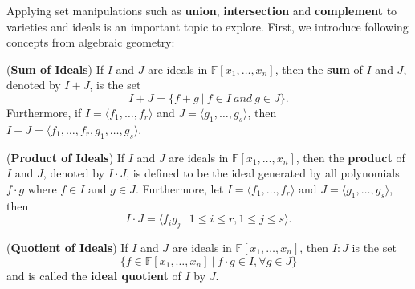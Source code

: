\begin{figure}[hbt]
\end{figure}
Applying set manipulations such as {\bf union}, {\bf intersection} and {\bf complement} to varieties 
and ideals is an important topic to explore. First, we introduce following concepts from algebraic geometry:
\begin{Definition}
\label{def:sum}
({\bf Sum of Ideals}) If $I$ and $J$ are ideals in $\mathbb F[x_1, \dots, x_n]$, then the 
{\bf sum} of $I$ and $J$, denoted by $I + J$, is the set
  \begin{equation}
  I + J = \{f + g\ |\ f \in I \ and\  g \in J\}.
  \end{equation}
Furthermore, if $I = \langle f_1, \dots, f_r\rangle$ and 
$J = \langle g_1, \dots, g_s\rangle$, then 
$I + J = \langle f_1, \dots, f_r, g_1, \dots, g_s\rangle$.
\end{Definition}
\begin{Definition}
\label{def:prod}
({\bf Product of Ideals}) If $I$ and $J$ are ideals in $\mathbb F[x_1, \dots, x_n]$, then the
{\bf product} of $I$ and $J$, denoted by $I \cdot J$, is defined to be the ideal generated 
by all polynomials $f \cdot g$ where $f \in I$ and $g \in J$. Furthermore, let
$I = \langle f_1, \dots, f_r\rangle$ and $J = \langle g_1, \dots, g_s\rangle$, then
  \begin{equation}
  I \cdot J = \langle f_ig_j\ |\ 1 \leq i \leq r, 1 \leq j \leq s\rangle .
  \end{equation}
\end{Definition}
\begin{Definition}
({\bf Quotient of Ideals}) If $I$ and $J$ are ideals in $\mathbb F[x_1, \dots, x_n]$, then $I:J$
is the set
  \begin{equation}
  \{f \in \mathbb F[x_1, \dots, x_n]\ |\ f\cdot g \in I, \forall g \in J\}
  \end{equation}
and is called the {\bf ideal quotient} of $I$ by $J$.
\end{Definition}
